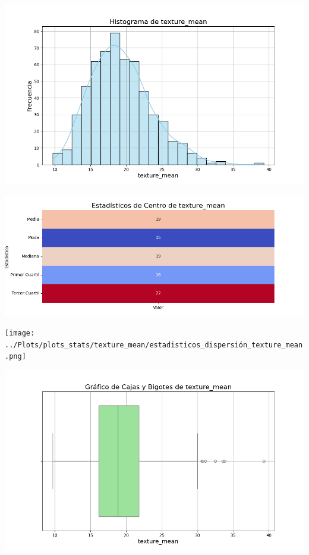 \documentclass[a4paper, 12pt]{article}
\begin{document}
	\includegraphics[width=\textwidth]{../Plots/plots_stats/texture_mean/histograma_texture_mean.png}




\includegraphics[width=\textwidth]{../Plots/plots_stats/texture_mean/estadisticas_centro_texture_mean.png}




\texttt{[image: ../Plots/plots\_stats/texture\_mean/estadisticos\_dispersión\_texture\_mean.png]}



\includegraphics[width=\textwidth]{../Plots/plots_stats/texture_mean/boxplot_texture_mean.png}
\end{document}
